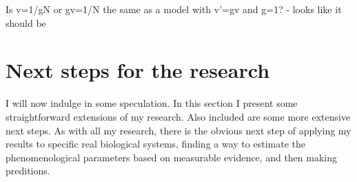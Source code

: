 Is v=1/gN or gv=1/N the same as a model with v’=gv and g=1? - looks like it should be
\fi



\section{Next steps for the research}
I will now indulge in some speculation. 
In this section I present some straightforward extensions of my research. 
Also included are some more extensive next steps. 
As with all my research, there is the obvious next step of applying my results to specific real biological systems, finding a way to estimate the phenomenological parameters based on measurable evidence, and then making preditions. 

